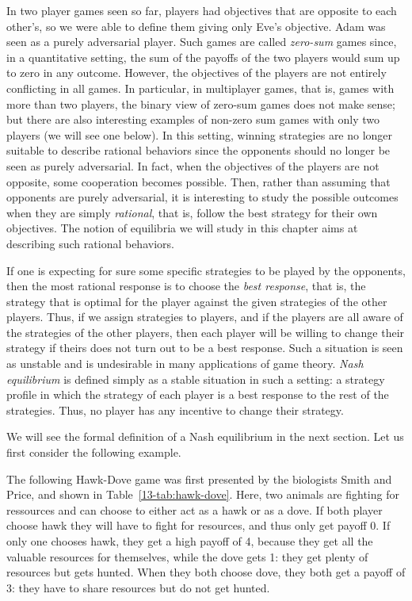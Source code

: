 

In two player games seen so far, players had objectives that are
opposite to each other's, so we were able to define them giving only
Eve's objective. Adam was seen as a purely adversarial player. Such games
are called \emph{zero-sum} games since, in a quantitative setting, the
sum of the payoffs of the two players would sum up to zero in any
outcome. However, the objectives of the players are not entirely
conflicting in all games.
In particular, in multiplayer games, that is,
games with more than two players, the binary view of zero-sum games
does not make sense;
but there are also interesting examples of non-zero sum games with only two
players (we will see one below). In this setting, winning strategies are
no longer suitable to describe rational behaviors since the opponents
should no longer be seen as purely adversarial. In fact, when the
objectives of the players are not opposite, some cooperation becomes
possible. Then, rather than assuming that opponents are purely
adversarial, it is interesting to study the possible outcomes when they
are simply \emph{rational}, that is, follow the best strategy for their
own objectives. The notion of equilibria we will study in this chapter
aims at describing such rational behaviors.

If one is expecting for sure some specific strategies to be played by the
opponents, then the most rational response is to choose the
\emph{best response}, that is, the strategy that is optimal for the
player against the given strategies of the other players. Thus, if we
assign strategies to players, and if the players are all aware of the
strategies of the other players, then each player will be willing to
change their strategy if theirs does not turn out to be a best response.
Such a situation is seen as unstable and is undesirable in many
applications of game theory. \emph{Nash equilibrium} is defined simply
as a stable situation in such a setting: a strategy profile in which the
strategy of each player is a best response to the rest of the
strategies. Thus, no player has any incentive to change their strategy.

We will see the formal definition of a Nash equilibrium in the next
section. Let us first consider the following example.

The following Hawk-Dove game was first presented by the biologists Smith
and Price, and shown in Table~\cref{13-tab:hawk-dove}.
Here, two animals are fighting for ressources and can choose to
either act as a hawk or as a dove.
If both player choose hawk they will have to fight for resources, and
thus only get payoff 0. If only one chooses hawk, they get a high payoff of
4, because they get all the valuable resources for themselves, while the dove
gets 1: they get plenty of resources but gets hunted. When they both choose
dove, they both get a payoff of 3: they have to share resources but do not get
hunted.

